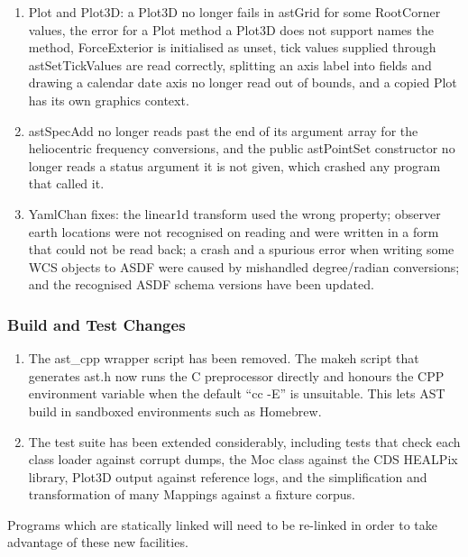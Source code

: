 \documentclass[twoside,11pt]{starlink}
\begin{document}
\begin{enumerate}
\item Plot and Plot3D: a Plot3D no longer fails in astGrid for some RootCorner values, the error for a Plot method a Plot3D does not support names the method, ForceExterior is initialised as unset, tick values supplied through astSetTickValues are read correctly, splitting an axis label into fields and drawing a calendar date axis no longer read out of bounds, and a copied Plot has its own graphics context.
\item astSpecAdd no longer reads past the end of its argument array for the heliocentric frequency conversions, and the public astPointSet constructor no longer reads a status argument it is not given, which crashed any program that called it.
\item YamlChan fixes: the linear1d transform used the wrong property; observer earth locations were not recognised on reading and were written in a form that could not be read back; a crash and a spurious error when writing some WCS objects to ASDF were caused by mishandled degree/radian conversions; and the recognised ASDF schema versions have been updated.
\end{enumerate}

\subsubsection{Build and Test Changes}

\begin{enumerate}
\item The ast\_cpp wrapper script has been removed.
  The makeh script that generates ast.h now runs the C preprocessor directly and honours the CPP environment variable when the default ``cc -E'' is unsuitable.
  This lets AST build in sandboxed environments such as Homebrew.
\item The test suite has been extended considerably, including tests that check each class loader against corrupt dumps, the Moc class against the CDS HEALPix library, Plot3D output against reference logs, and the simplification and transformation of many Mappings against a fixture corpus.
\end{enumerate}

Programs which are statically linked will need to be re-linked in
order to take advantage of these new facilities.
\end{document}
